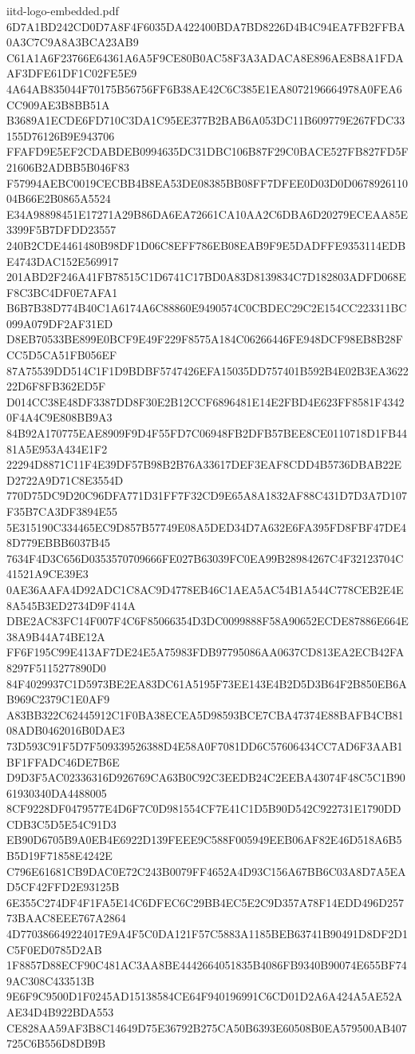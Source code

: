 \begin{filecontents*}[overwrite]{iitd-logo-embedded.pdf}
6D7A1BD242CD0D7A8F4F6035DA422400BDA7BD8226D4B4C94EA7FB2FFBA0A3C7C9A8A3BCA23AB9
C61A1A6F23766E64361A6A5F9CE80B0AC58F3A3ADACA8E896AE8B8A1FDAAF3DFE61DF1C02FE5E9
4A64AB835044F70175B56756FF6B38AE42C6C385E1EA8072196664978A0FEA6CC909AE3B8BB51A
B3689A1ECDE6FD710C3DA1C95EE377B2BAB6A053DC11B609779E267FDC33155D76126B9E943706
FFAFD9E5EF2CDABDEB0994635DC31DBC106B87F29C0BACE527FB827FD5F21606B2ADBB5B046F83
F57994AEBC0019CECBB4B8EA53DE08385BB08FF7DFEE0D03D0D067892611004B66E2B0865A5524
E34A98898451E17271A29B86DA6EA72661CA10AA2C6DBA6D20279ECEAA85E3399F5B7DFDD23557
240B2CDE4461480B98DF1D06C8EFF786EB08EAB9F9E5DADFFE9353114EDBE4743DAC152E569917
201ABD2F246A41FB78515C1D6741C17BD0A83D8139834C7D182803ADFD068EF8C3BC4DF0E7AFA1
B6B7B38D774B40C1A6174A6C88860E9490574C0CBDEC29C2E154CC223311BC099A079DF2AF31ED
D8EB70533BE899E0BCF9E49F229F8575A184C06266446FE948DCF98EB8B28FCC5D5CA51FB056EF
87A75539DD514C1F1D9BDBF5747426EFA15035DD757401B592B4E02B3EA362222D6F8FB362ED5F
D014CC38E48DF3387DD8F30E2B12CCF6896481E14E2FBD4E623FF8581F43420F4A4C9E808BB9A3
84B92A170775EAE8909F9D4F55FD7C06948FB2DFB57BEE8CE0110718D1FB4481A5E953A434E1F2
22294D8871C11F4E39DF57B98B2B76A33617DEF3EAF8CDD4B5736DBAB22ED2722A9D71C8E3554D
770D75DC9D20C96DFA771D31FF7F32CD9E65A8A1832AF88C431D7D3A7D107F35B7CA3DF3894E55
5E315190C334465EC9D857B57749E08A5DED34D7A632E6FA395FD8FBF47DE48D779EBBB6037B45
7634F4D3C656D0353570709666FE027B63039FC0EA99B28984267C4F32123704C41521A9CE39E3
0AE36AAFA4D92ADC1C8AC9D4778EB46C1AEA5AC54B1A544C778CEB2E4E8A545B3ED2734D9F414A
DBE2AC83FC14F007F4C6F85066354D3DC0099888F58A90652ECDE87886E664E38A9B44A74BE12A
FF6F195C99E413AF7DE24E5A75983FDB97795086AA0637CD813EA2ECB42FA8297F5115277890D0
84F4029937C1D5973BE2EA83DC61A5195F73EE143E4B2D5D3B64F2B850EB6AB969C2379C1E0AF9
A83BB322C62445912C1F0BA38ECEA5D98593BCE7CBA47374E88BAFB4CB8108ADB0462016B0DAE3
73D593C91F5D7F509339526388D4E58A0F7081DD6C57606434CC7AD6F3AAB1BF1FFADC46DE7B6E
D9D3F5AC02336316D926769CA63B0C92C3EEDB24C2EEBA43074F48C5C1B9061930340DA4488005
8CF9228DF0479577E4D6F7C0D981554CF7E41C1D5B90D542C922731E1790DDCDB3C5D5E54C91D3
EB90D6705B9A0EB4E6922D139FEEE9C588F005949EEB06AF82E46D518A6B5B5D19F71858E4242E
C796E61681CB9DAC0E72C243B0079FF4652A4D93C156A67BB6C03A8D7A5EAD5CF42FFD2E93125B
6E355C274DF4F1FA5E14C6DFEC6C29BB4EC5E2C9D357A78F14EDD496D25773BAAC8EEE767A2864
4D770386649224017E9A4F5C0DA121F57C5883A1185BEB63741B90491D8DF2D1C5F0ED0785D2AB
1F8857D88ECF90C481AC3AA8BE4442664051835B4086FB9340B90074E655BF749AC308C433513B
9E6F9C9500D1F0245AD15138584CE64F940196991C6CD01D2A6A424A5AE52AAE34D4B922BDA553
CE828AA59AF3B8C14649D75E36792B275CA50B6393E60508B0EA579500AB407725C6B556D8DB9B

\end{filecontents*}
